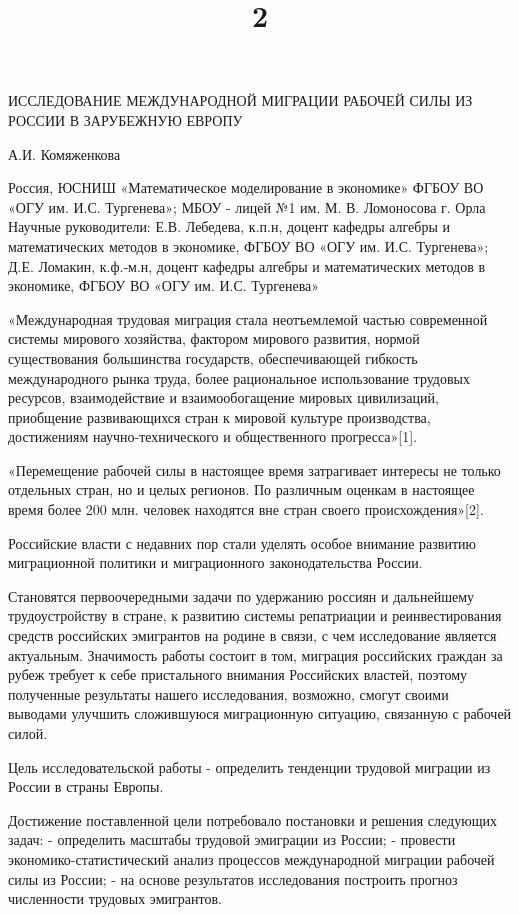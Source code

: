 \documentclass{article}
\begin{document}
\begin{center}
\title{2}
ИССЛЕДОВАНИЕ МЕЖДУНАРОДНОЙ МИГРАЦИИ РАБОЧЕЙ СИЛЫ ИЗ РОССИИ В ЗАРУБЕЖНУЮ ЕВРОПУ

А.И. Комяженкова

Россия, ЮСНИШ «Математическое моделирование в экономике» ФГБОУ ВО «ОГУ им. И.С. Тургенева»; МБОУ - лицей №1 им. М. В. Ломоносова г. Орла
Научные руководители: Е.В. Лебедева, к.п.н, доцент кафедры алгебры и математических методов в экономике, ФГБОУ ВО «ОГУ им. И.С. Тургенева»; Д.Е. Ломакин, к.ф.-м.н, доцент кафедры алгебры и математических методов в экономике, ФГБОУ ВО «ОГУ им. И.С. Тургенева»
\end{center}
«Международная трудовая миграция стала неотъемлемой частью современной системы мирового хозяйства, фактором мирового развития, нормой существования большинства государств, обеспечивающей гибкость международного рынка труда, более рациональное использование трудовых ресурсов, взаимодействие и взаимообогащение мировых цивилизаций, приобщение развивающихся стран к мировой культуре производства, достижениям научно-технического и общественного прогресса»[1].

«Перемещение рабочей силы в настоящее время затрагивает интересы не только отдельных стран, но и целых регионов. По различным оценкам в настоящее время более 200 млн. человек находятся вне стран своего происхождения»[2].

Российские власти с недавних пор стали уделять особое внимание развитию миграционной политики и миграционного законодательства России.

Становятся первоочередными задачи по удержанию россиян и дальнейшему трудоустройству в стране, к развитию системы репатриации и реинвестирования средств российских эмигрантов на родине в связи, с чем исследование является актуальным. Значимость работы состоит в том, миграция российских граждан за рубеж требует к себе пристального внимания Российских властей, поэтому полученные результаты нашего исследования, возможно, смогут своими выводами улучшить сложившуюся миграционную ситуацию, связанную с рабочей силой.

Цель исследовательской работы - определить тенденции трудовой миграции из России в страны Европы.

Достижение поставленной цели потребовало постановки и решения следующих задач: - определить масштабы трудовой эмиграции из России; - провести экономико-статистический анализ процессов международной миграции рабочей силы из России; - на основе результатов исследования построить прогноз численности трудовых эмигрантов.
\end{document}
